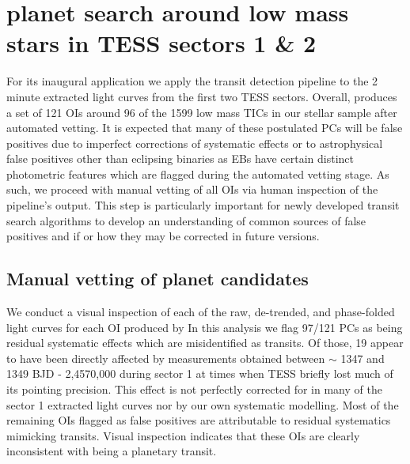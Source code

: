 \section{\pipeline{} planet search around low mass stars in TESS sectors 1 \& 2} \label{sect:search}
For its inaugural application we apply the \pipeline{} transit detection pipeline to the
2 minute extracted light curves from the first two TESS sectors. 
Overall, \pipeline{} produces a set of 121 OIs around 96 of the 1599 low mass TICs in our stellar
sample after automated vetting.
It is expected that many of these postulated PCs will be false positives due to
imperfect corrections of systematic effects or to astrophysical false positives other than eclipsing
binaries as EBs have certain distinct photometric features which are flagged during the automated 
vetting stage. As such, we proceed with manual vetting of all \pipeline{} OIs via human inspection
of the pipeline's output. This step is particularly important for newly developed transit
search algorithms to develop an understanding of common sources of false positives and if or how
they may be corrected in future versions.

\subsection{Manual vetting of \pipeline{} planet candidates} \label{sect:manual}
We conduct a visual inspection of each of the raw, de-trended, and phase-folded light curves for
each OI produced by  
In this analysis we flag 97/121 PCs as being residual systematic effects which are
misidentified as transits. Of those, 19 appear to have been directly affected by measurements
obtained between $\sim$ 1347 and 1349 BJD - 2,4570,000 during sector 1 at times when TESS briefly lost much
of its pointing precision. This effect is not perfectly corrected for in many of the sector 1 extracted light
curves nor by our own systematic modelling. Most of the remaining OIs flagged as false positives are attributable
to residual systematics mimicking transits. Visual inspection indicates that these OIs are clearly
inconsistent with being a planetary transit.

